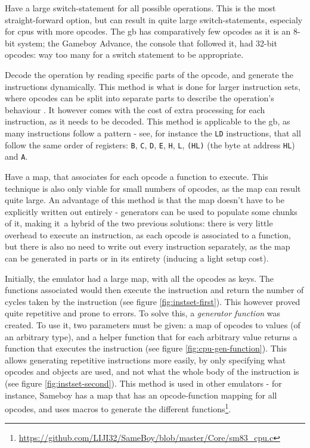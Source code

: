 \documentclass[11pt]{report}
\newcommand{\ftnt}[1]{\footnote{\url{#1}}}
\begin{document}
\begin{compactitem}
    \item Have a large switch-statement for all possible operations. This is the most straight-forward option, but can result in quite large switch-statements, especialy for \glspl{cpu} with more opcodes. The \gls{gb} has comparatively few opcodes as it is an 8-bit system; the Gameboy Advance, the console that followed it, had 32-bit opcodes: way too many for a switch statement to be appropriate.
    \item Decode the operation by reading specific parts of the opcode, and generate the instructions dynamically. This method is what is done for larger instruction sets, where opcodes can be split into separate parts to describe the operation's behaviour \cite[ARM CPU Reference]{gbatek}. It however comes with the cost of extra processing for each instruction, as it needs to be decoded. This method is applicable to the \gls{gb}, as many instructions follow a pattern - see, for instance the \texttt{LD} instructions, that all follow the same order of registers: \texttt{B}, \texttt{C}, \texttt{D}, \texttt{E}, \texttt{H}, \texttt{L}, \texttt{(HL)} (the byte at address \texttt{HL}) and \texttt{A}.
    \item Have a map, that associates for each opcode a function to execute. This technique is also only viable for small numbers of opcodes, as the map can result quite large. An advantage of this method is that the map doesn't have to be explicitly written out entirely - generators can be used to populate some chunks of it, making it a hybrid of the two previous solutions: there is very little overhead to execute an instruction, as each opcode is associated to a function, but there is also no need to write out every instruction separately, as the map can be generated in parts or in its entirety (inducing a light setup cost).
\end{compactitem}

Initially, the emulator had a large map, with all the opcodes as keys. The functions associated would then execute the instruction and return the number of cycles taken by the instruction (see figure \ref{fig:instset-first}). This however proved quite repetitive and prone to errors. To solve this, a \textit{generator function} was created. To use it, two parameters must be given: a map of opcodes to values (of an arbitrary type), and a helper function that for each arbitrary value returns a function that executes the instruction (see figure \ref{fig:cpu-gen-function}). This allows generating repetitive instructions more easily, by only specifying what opcodes and objects are used, and not what the whole body of the instruction is (see figure \ref{fig:instset-second}). This method is used in other emulators - for instance, Sameboy has a map that has an opcode-function mapping for all opcodes, and uses macros to generate the different functions\ftnt{https://github.com/LIJI32/SameBoy/blob/master/Core/sm83\_cpu.c}.
\end{document}

